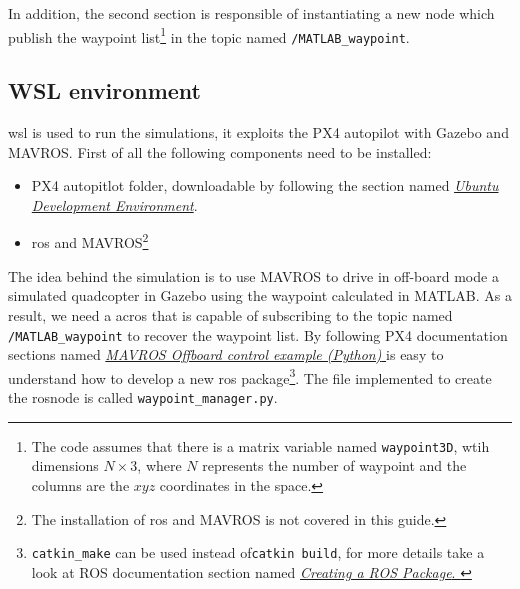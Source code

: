 In addition, the second section is responsible of instantiating a new node which publish the waypoint list\footnote{The code assumes that there is a matrix variable named \texttt{waypoint3D}, wtih dimensions $N \times 3$, where $N$ represents the number of waypoint and the columns are the $xyz$ coordinates in the space.} in the topic named \texttt{/MATLAB\_waypoint}.


\subsection{WSL environment}
\ac{wsl} is used to run the simulations, it exploits the PX4 autopilot with Gazebo and MAVROS. First of all the following components need to be installed:
\begin{itemize}
	\item PX4 autopitlot folder, downloadable by following the section named \href{https://docs.px4.io/main/en/dev_setup/dev_env_linux_ubuntu.html}{\textit{Ubuntu Development Environment}}. 
	\item \ac{ros} and MAVROS\footnote{The installation of \ac{ros} and MAVROS is not covered in this guide.}
\end{itemize}
The idea behind the simulation is to use MAVROS to drive in off-board mode a simulated quadcopter in Gazebo using the waypoint calculated in MATLAB. As a result, we need a ac{ros} that is capable of subscribing to the topic named \texttt{/MATLAB\_waypoint} to recover the waypoint list. By following PX4 documentation sections named \href{https://docs.px4.io/main/en/ros/mavros_offboard_python.html}{\textit{MAVROS Offboard control example (Python)
}} is easy to understand how to develop a new \ac{ros} package\footnote{\texttt{catkin\_make} can be used instead of\texttt{catkin build}, for more details take a look at ROS documentation section named \href{http://wiki.ros.org/ROS/Tutorials/CreatingPackage}{\textit{Creating a ROS Package}.
}}.
The file implemented to create the rosnode is called \texttt{waypoint\_manager.py}. 


